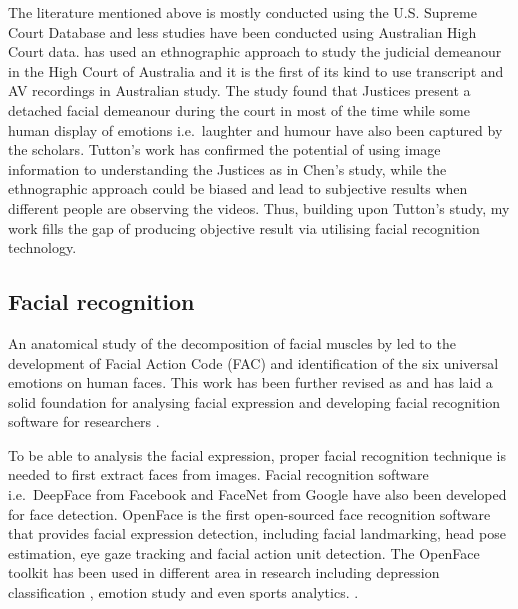 \documentclass{monashthesis}
\begin{document}
The literature mentioned above is mostly conducted using the U.S. Supreme Court Database and less studies have been conducted using Australian High Court data. \textcite{tutton2018judicial} has used an ethnographic approach to study the judicial demeanour in the High Court of Australia and it is the first of its kind to use transcript and AV recordings in Australian study. The study found that Justices present a detached facial demeanour during the court in most of the time while some human display of emotions i.e.~laughter and humour have also been captured by the scholars. Tutton's work has confirmed the potential of using image information to understanding the Justices as in Chen's study, while the ethnographic approach could be biased and lead to subjective results when different people are observing the videos. Thus, building upon Tutton's study, my work fills the gap of producing objective result via utilising facial recognition technology.

\hypertarget{facial-recognition}{%
\subsection{Facial recognition}\label{facial-recognition}}

An anatomical study of the decomposition of facial muscles by \autocite{ekman1976measuring} led to the development of Facial Action Code (FAC) \autocite{ekman1978} and identification of the six universal emotions on human faces. This work has been further revised as \autocite{paulekmangroup} and has laid a solid foundation for analysing facial expression and developing facial recognition software for researchers \autocites{Kobayashi1992}{huang1997}{lien2000}{Kappoor2003}{Tong2007}{Cohn2009}{Lucey2010}.

To be able to analysis the facial expression, proper facial recognition technique is needed to first extract faces from images. Facial recognition software i.e.~DeepFace \autocite{taigman2014deepface} from Facebook and FaceNet \autocite{schroff2015facenet} from Google have also been developed for face detection. OpenFace \autocite{baltrusaitis2018openface} is the first open-sourced face recognition software that provides facial expression detection, including facial landmarking, head pose estimation, eye gaze tracking and facial action unit detection. The OpenFace toolkit has been used in different area in research including depression classification \autocites{yang2016decision}{nasir2016multimodal}, emotion study \autocites{Pan2018}{Nasir2016}{Huber2018} and even sports analytics. \autocite{kovalchik2018going}.
\end{document}
